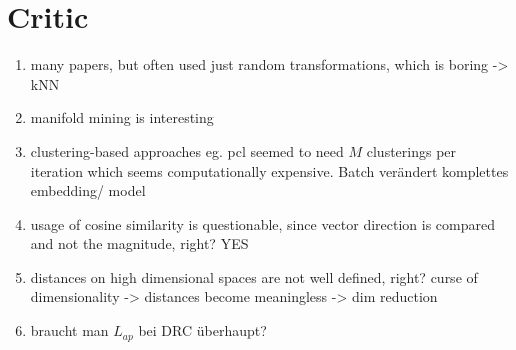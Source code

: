 \section{Critic}\label{sec:critic}

\begin{enumerate}
    \item many papers, but often used just random transformations, which is boring -> kNN
    \item manifold mining is interesting
    \item clustering-based approaches eg. \ac{pcl} seemed to need $M$ clusterings per iteration 
    which seems computationally expensive. Batch verändert komplettes embedding/ model
    \item usage of cosine similarity is questionable, since vector direction is compared and 
    not the magnitude, right? YES
    \item distances on high dimensional spaces are not well defined, right? curse of dimensionality -> distances become meaningless -> dim reduction
    \item braucht man $L_{ap}$ bei DRC überhaupt?
\end{enumerate}

